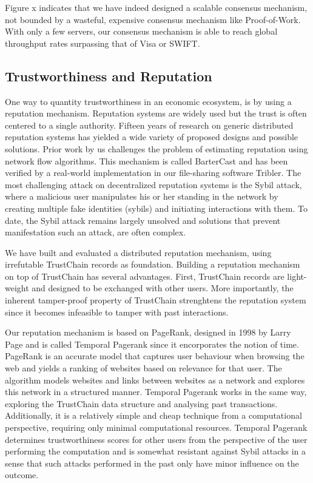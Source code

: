 \documentclass[USenglish]{article}
\begin{document}
Figure x indicates that we have indeed designed a scalable consensus mechanism, not bounded by a wasteful, expensive consensus mechanism like Proof-of-Work.
With only a few servers, our consensus mechanism is able to reach global throughput rates surpassing that of Visa or SWIFT.

\subsection{Trustworthiness and Reputation}

One way to quantity trustworthiness in an economic ecosystem, is by using a reputation mechanism.
Reputation systems are widely used but the trust is often centered to a single authority.
Fifteen years of research on generic distributed reputation systems has yielded a wide variety of proposed designs and possible solutions.
Prior work by us challenges the problem of estimating reputation using network flow algorithms.
This mechanism is called BarterCast and has been verified by a real-world implementation in our file-sharing software Tribler.
The most challenging attack on decentralized reputation systems is the Sybil attack, where a malicious user manipulates his or her standing in the network by creating multiple fake identities (sybils) and initiating interactions with them.
To date, the Sybil attack remains largely unsolved and solutions that prevent manifestation such an attack, are often complex.

We have built and evaluated a distributed reputation mechanism, using irrefutable TrustChain records as foundation.
Building a reputation mechanism on top of TrustChain has several advantages.
First, TrustChain records are light-weight and designed to be exchanged with other users.
More importantly, the inherent tamper-proof property of TrustChain strenghtens the reputation system since it becomes infeasible to tamper with past interactions.

Our reputation mechanism is based on PageRank, designed in 1998 by Larry Page and is called Temporal Pagerank since it encorporates the notion of time.
PageRank is an accurate model that captures user behaviour when browsing the web and yields a ranking of websites based on relevance for that user.
The algorithm models websites and links between websites as a network and explores this network in a structured manner.
Temporal Pagerank works in the same way, exploring the TrustChain data structure and analysing past transactions.
Additionally, it is a relatively simple and cheap technique from a computational perspective, requiring only minimal computational resources.
Temporal Pagerank determines trustworthiness scores for other users from the perspective of the user performing the computation and is somewhat resistant against Sybil attacks in a sense that such attacks performed in the past only have minor influence on the outcome.
\end{document}
